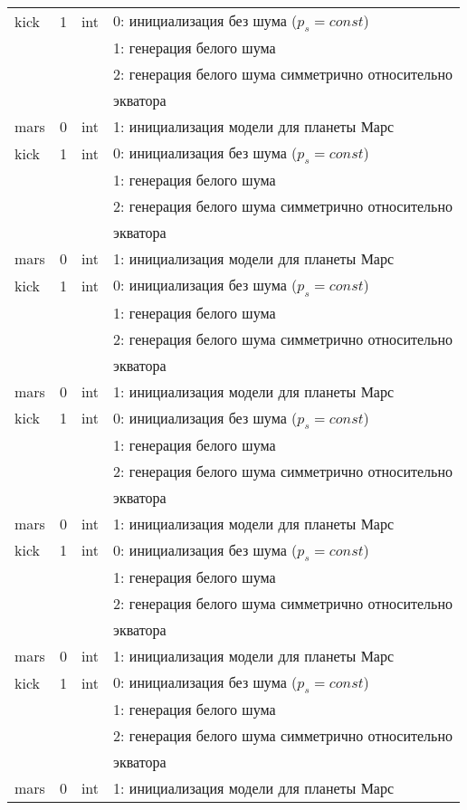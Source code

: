 \begin{longtable}[c]{|l|c|l|l|}
    kick & 1 & int & 0: инициализация без шума ($p_s = const$) \\
          &   &     & 1: генерация белого шума                  \\
          &   &     & 2: генерация белого шума симметрично относительно \\
      & & & экватора    \\
     mars & 0 & int & 1: инициализация модели для планеты Марс     \\
    kick & 1 & int & 0: инициализация без шума ($p_s = const$) \\
          &   &     & 1: генерация белого шума                  \\
          &   &     & 2: генерация белого шума симметрично относительно \\
      & & & экватора    \\
     mars & 0 & int & 1: инициализация модели для планеты Марс     \\
    kick & 1 & int & 0: инициализация без шума ($p_s = const$) \\
          &   &     & 1: генерация белого шума                  \\
          &   &     & 2: генерация белого шума симметрично относительно \\
      & & & экватора    \\
     mars & 0 & int & 1: инициализация модели для планеты Марс     \\
    kick & 1 & int & 0: инициализация без шума ($p_s = const$) \\
          &   &     & 1: генерация белого шума                  \\
          &   &     & 2: генерация белого шума симметрично относительно \\
      & & & экватора    \\
     mars & 0 & int & 1: инициализация модели для планеты Марс     \\
    kick & 1 & int & 0: инициализация без шума ($p_s = const$) \\
          &   &     & 1: генерация белого шума                  \\
          &   &     & 2: генерация белого шума симметрично относительно \\
      & & & экватора    \\
     mars & 0 & int & 1: инициализация модели для планеты Марс     \\
    kick & 1 & int & 0: инициализация без шума ($p_s = const$) \\
          &   &     & 1: генерация белого шума                  \\
          &   &     & 2: генерация белого шума симметрично относительно \\
      & & & экватора    \\
     mars & 0 & int & 1: инициализация модели для планеты Марс     \\ 
    \end{longtable}
\normalsize%
\endgroup
